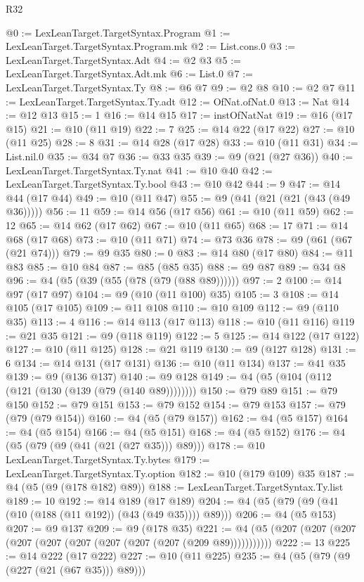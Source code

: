 \begin{lexlean}{R32}
\begin{coremodule}
{{{{{{{{{{{{{{{{{{{{{{{{{{{{{{{{{{{{{{{{{{{{{{{{{{{@0 := LexLeanTarget.TargetSyntax.Program
@1 := LexLeanTarget.TargetSyntax.Program.mk
@2 := List.cons.{0}
@3 := LexLeanTarget.TargetSyntax.Adt
@4 := @2 @3
@5 := LexLeanTarget.TargetSyntax.Adt.mk
@6 := List.{0}
@7 := LexLeanTarget.TargetSyntax.Ty
@8 := @6 @7
@9 := @2 @8
@10 := @2 @7
@11 := LexLeanTarget.TargetSyntax.Ty.adt
@12 := OfNat.ofNat.{0}
@13 := Nat
@14 := @12 @13
@15 := 1
@16 := @14 @15
@17 := instOfNatNat
@19 := @16 (@17 @15)
@21 := @10 (@11 @19)
@22 := 7
@25 := @14 @22 (@17 @22)
@27 := @10 (@11 @25)
@28 := 8
@31 := @14 @28 (@17 @28)
@33 := @10 (@11 @31)
@34 := List.nil.{0}
@35 := @34 @7
@36 := @33 @35
@39 := @9 (@21 (@27 @36))
@40 := LexLeanTarget.TargetSyntax.Ty.nat
@41 := @10 @40
@42 := LexLeanTarget.TargetSyntax.Ty.bool
@43 := @10 @42
@44 := 9
@47 := @14 @44 (@17 @44)
@49 := @10 (@11 @47)
@55 := @9 (@41 (@21 (@21 (@43 (@49 @36)))))
@56 := 11
@59 := @14 @56 (@17 @56)
@61 := @10 (@11 @59)
@62 := 12
@65 := @14 @62 (@17 @62)
@67 := @10 (@11 @65)
@68 := 17
@71 := @14 @68 (@17 @68)
@73 := @10 (@11 @71)
@74 := @73 @36
@78 := @9 (@61 (@67 (@21 @74)))
@79 := @9 @35
@80 := 0
@83 := @14 @80 (@17 @80)
@84 := @11 @83
@85 := @10 @84
@87 := @85 (@85 @35)
@88 := @9 @87
@89 := @34 @8
@96 := @4 (@5 (@39 (@55 (@78 (@79 (@88 @89))))))
@97 := 2
@100 := @14 @97 (@17 @97)
@104 := @9 (@10 (@11 @100) @35)
@105 := 3
@108 := @14 @105 (@17 @105)
@109 := @11 @108
@110 := @10 @109
@112 := @9 (@110 @35)
@113 := 4
@116 := @14 @113 (@17 @113)
@118 := @10 (@11 @116)
@119 := @21 @35
@121 := @9 (@118 @119)
@122 := 5
@125 := @14 @122 (@17 @122)
@127 := @10 (@11 @125)
@128 := @21 @119
@130 := @9 (@127 @128)
@131 := 6
@134 := @14 @131 (@17 @131)
@136 := @10 (@11 @134)
@137 := @41 @35
@139 := @9 (@136 @137)
@140 := @9 @128
@149 := @4 (@5 (@104 (@112 (@121 (@130 (@139 (@79 (@140 @89))))))))
@150 := @79 @89
@151 := @79 @150
@152 := @79 @151
@153 := @79 @152
@154 := @79 @153
@157 := @79 (@79 (@79 @154))
@160 := @4 (@5 (@79 @157))
@162 := @4 (@5 @157)
@164 := @4 (@5 @154)
@166 := @4 (@5 @151)
@168 := @4 (@5 @152)
@176 := @4 (@5 (@79 (@9 (@41 (@21 (@27 @35))) @89)))
@178 := @10 LexLeanTarget.TargetSyntax.Ty.bytes
@179 := LexLeanTarget.TargetSyntax.Ty.option
@182 := @10 (@179 @109) @35
@187 := @4 (@5 (@9 (@178 @182) @89))
@188 := LexLeanTarget.TargetSyntax.Ty.list
@189 := 10
@192 := @14 @189 (@17 @189)
@204 := @4 (@5 (@79 (@9 (@41 (@10 (@188 (@11 @192)) (@43 (@49 @35)))) @89)))
@206 := @4 (@5 @153)
@207 := @9 @137
@209 := @9 (@178 @35)
@221 := @4 (@5 (@207 (@207 (@207 (@207 (@207 (@207 (@207 (@207 (@207 (@209 @89)))))))))))
@222 := 13
@225 := @14 @222 (@17 @222)
@227 := @10 (@11 @225)
@235 := @4 (@5 (@79 (@9 (@227 (@21 (@67 @35))) @89)))
}}}}}}}}}}}}}}}}}}}}}}}}}}}}}}}}}}}}}}}}}}}}}}}}}}}
\end{coremodule}
\end{lexlean}
